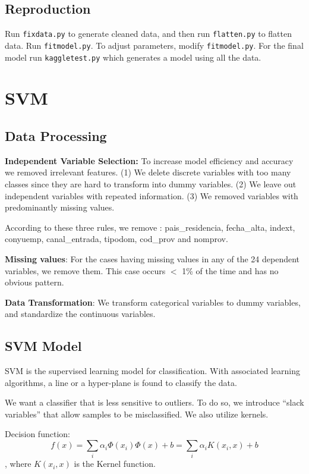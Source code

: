 \documentclass{article}
\begin{document}
\begin{spacing}{1}
\begin{large}
\subsection{Reproduction}
Run \texttt{fixdata.py} to generate cleaned data, and then run \texttt{flatten.py} to flatten data. Run \texttt{fitmodel.py}. To adjust parameters, modify \texttt{fitmodel.py}. For the final model run \texttt{kaggletest.py} which generates a model using all the data.

\section{SVM}

\subsection{Data Processing}
\textbf{Independent Variable Selection:} To increase model efficiency and accuracy we removed irrelevant features. (1) We delete discrete variables with too many classes since they are hard to transform into dummy variables. (2) We leave out independent variables with repeated information. (3) We removed variables with predominantly missing values.

According to these three  rules, we remove : pais\_residencia, fecha\_alta, indext, conyuemp, canal\_entrada, tipodom, cod\_prov and nomprov.

\textbf{Missing values}: For the cases having missing values in any of the 24 dependent variables, we remove them. This case occurs $<$ 1\% of the time and has no obvious pattern.

\textbf{Data Transformation}: We transform categorical variables to dummy variables, and standardize the continuous variables.

\subsection{SVM Model}

SVM is the supervised learning model for classification. With associated learning algorithms, a line or a hyper-plane is found to classify the data.

We want a classifier that is less sensitive to outliers. To do so, we introduce “slack variables” that allow samples to be misclassified. We also utilize kernels.

Decision function:
$$f(x) = \displaystyle\sum_{i}\alpha_i\Phi(x_i)\Phi(x)+b = \displaystyle\sum_{i}\alpha_{i} K(x_i, x)+b$$, where $K(x_i, x)$ is the Kernel function.


\end{large}
\end{spacing}
\end{document}
